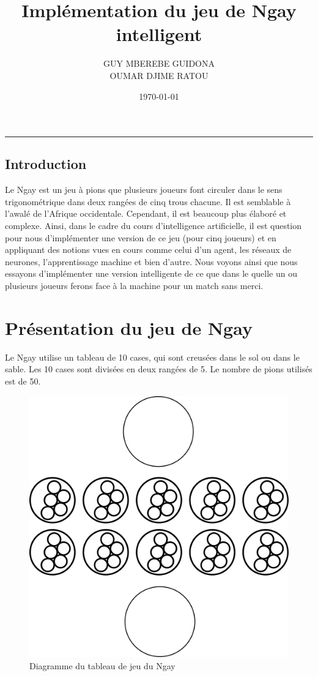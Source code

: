 \documentclass[12pt]{article}
\title{\textbf{Implémentation du jeu de Ngay intelligent}}
\author{\Large {GUY MBEREBE GUIDONA}\\
		\Large {OUMAR DJIME RATOU}}
\date{\today}
\begin{document}
	\maketitle
	\hrule
	\begin{center}
		\section*{Introduction}
	\end{center}
\noindent Le Ngay est un jeu à pions que plusieurs joueurs font circuler dans le sens trigonométrique dans deux rangées de cinq trous chacune. Il est semblable à l’awalé de l’Afrique occidentale. Cependant, il est beaucoup plus élaboré et complexe. Ainsi, dans le cadre du cours d’intelligence artificielle, il est question pour nous d’implémenter une version de ce jeu (pour cinq joueurs) et en appliquant des notions vues en cours comme celui d’un agent, les réseaux de neurones, l’apprentissage machine et bien d’autre. Nous voyons ainsi que nous essayons d’implémenter une version intelligente de ce que dans le quelle un ou plusieurs joueurs ferons face à la machine pour un match sans merci.
	\newpage
	\section{Présentation du jeu de Ngay}
\noindent Le Ngay utilise un tableau de 10 cases, qui sont creusées dans le sol ou dans le sable. Les 10 cases sont divisées en deux rangées de 5.
Le nombre de pions utilisés est de 50.\\

\begin{figure}[h!]
\begin{center}
	\includegraphics[scale=0.5]{images/ngay-platform}
\end{center}
\caption{Diagramme du tableau de jeu du Ngay}
\end{figure}
\end{document}
